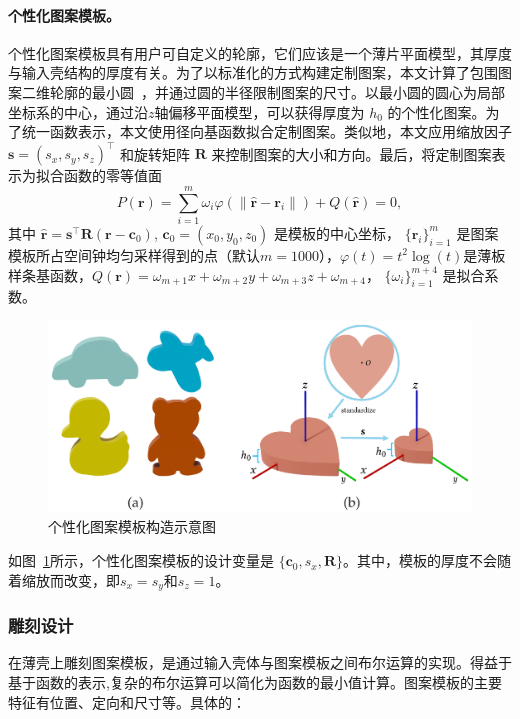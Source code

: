 \paragraph{个性化图案模板。}
个性化图案模板具有用户可自定义的轮廓，它们应该是一个薄片平面模型，其厚度与输入壳结构的厚度有关。为了以标准化的方式构建定制图案，本文计算了包围图案二维轮廓的最小圆~\cite{Sven1991}，并通过圆的半径限制图案的尺寸。以最小圆的圆心为局部坐标系的中心，通过沿$z$轴偏移平面模型，可以获得厚度为 $h_0$ 的个性化图案。为了统一函数表示，本文使用径向基函数拟合定制图案。类似地，本文应用缩放因子 $\mathbf{s}=(s_x,s_y,s_z)^\top$ 和旋转矩阵 $\mathbf{R}$ 来控制图案的大小和方向。最后，将定制图案表示为拟合函数的零等值面
\begin{equation}	
    P(\mathbf{r})=\sum_{i=1}^m\omega_i\varphi(\|\hat{\mathbf{r}}-\mathbf{r}_i\|)+Q(\hat{\mathbf{r}})=0,
\end{equation}
其中 $\hat{\mathbf{r}}=\mathbf{s}^\top\mathbf{R}(\mathbf{r}-\mathbf{c}_0)$, $\mathbf{c}_0=(x_0, y_0, z_0)$ 是模板的中心坐标， $\{\mathbf{r}_i\}_{i=1}^m$ 是图案模板所占空间钟均匀采样得到的点（默认$m=1000$），$\varphi(t)=t^2\log(t)$是薄板样条基函数，$Q(\mathbf{r})=\omega_{m+1}x+\omega_{m+2}y+\omega_{m+3}z+\omega_{m+4}$， $\{\omega_i\}_{i=1}^{m+4}$ 是拟合系数。
\begin{figure}
    \centering
    \includegraphics[width=1.0\linewidth]{./figures/custom-pattern}
    \caption{个性化图案模板构造示意图}
    \label{fig-custom}
\end{figure}
如图~\ref{fig-custom}所示，个性化图案模板的设计变量是 $\{\mathbf{c}_0, s_x, \mathbf{R}\}$。其中，模板的厚度不会随着缩放而改变，即$s_x=s_y$和$s_z=1$。

\subsubsection{雕刻设计} 
在薄壳上雕刻图案模板，是通过输入壳体与图案模板之间布尔运算的实现。得益于基于函数的表示,复杂的布尔运算可以简化为函数的最小值计算。图案模板的主要特征有位置、定向和尺寸等。具体的：
